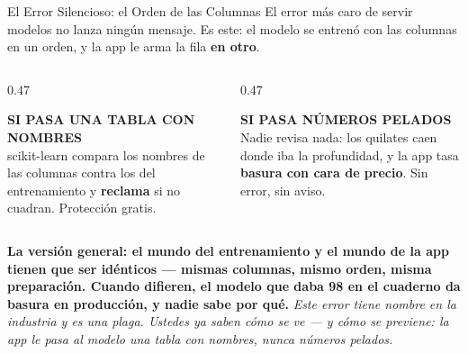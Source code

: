 \documentclass[aspectratio=169, 11pt]{beamer}
\begin{document}
\begin{frame}[shrink=5]{El Error Silencioso: el Orden de las Columnas}
  \vspace{2pt}
  {\scriptsize\color{textMuted}
   El error más caro de servir modelos no lanza ningún mensaje. Es este:
   el modelo se entrenó con las columnas en un orden, y la app le arma la
   fila \textbf{en otro}.}
  \vspace{2pt}
  \begin{columns}[T]
    \begin{column}{0.47\textwidth}
      \begin{tcolorbox}[colback=arcaGray, colframe=codeGreen, boxrule=0pt,
        leftrule=3pt, arc=3pt, left=8pt, right=8pt, top=3pt, bottom=3pt]
        {\scriptsize\color{codeGreen}\bfseries SI PASA UNA TABLA CON NOMBRES}\\[2pt]
        {\scriptsize\color{textMuted}
         scikit-learn compara los nombres de las columnas contra los del
         entrenamiento y \textbf{reclama} si no cuadran. Protección gratis.}
      \end{tcolorbox}
    \end{column}
    \begin{column}{0.47\textwidth}
      \begin{tcolorbox}[colback=arcaGray, colframe=arcaRed, boxrule=0pt,
        leftrule=3pt, arc=3pt, left=8pt, right=8pt, top=3pt, bottom=3pt]
        {\scriptsize\color{arcaRed}\bfseries SI PASA NÚMEROS PELADOS}\\[2pt]
        {\scriptsize\color{textMuted}
         Nadie revisa nada: los quilates caen donde iba la profundidad, y
         la app tasa \textbf{basura con cara de precio}. Sin error, sin
         aviso.}
      \end{tcolorbox}
    \end{column}
  \end{columns}
  \vspace{2pt}
  {\scriptsize\color{arcaDark}\bfseries
   La versión general: el mundo del entrenamiento y el mundo de la app
   tienen que ser \textbf{idénticos} --- mismas columnas, mismo orden, misma
   preparación. Cuando difieren, el modelo que daba 98 en el cuaderno da
   basura en producción, y nadie sabe por qué.}
  \vspace{2pt}
  {\scriptsize\color{arcaDark}\itshape
   Este error tiene nombre en la industria y es una plaga. Ustedes ya saben
   cómo se ve --- y cómo se previene: la app le pasa al modelo una tabla con
   nombres, nunca números pelados.}
\end{frame}
\end{document}
